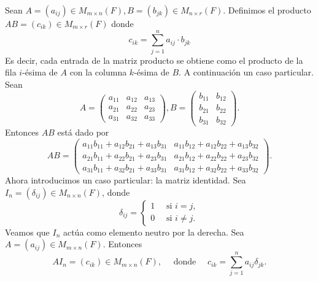 \documentclass[12pt,a4paper]{book}
\begin{document}
    Sean $A=(a_{ij})\in M_{m\times n}(F),B=(b_{jk})\in M_{n\times r}(F)$. Definimos el
    producto $AB=(c_{ik})\in M_{m\times r}(F)$ donde
    \begin{equation*}
        c_{ik}=\sum_{j=1}^{n}a_{ij}\cdot b_{jk}
    \end{equation*}
    Es decir, cada entrada de la matriz producto se obtiene como el producto de la fila $i$-ésima
    de $A$ con la columna $k$-ésima de $B$. A continuación un caso particular. Sean
    \begin{equation*}
        A=
        \begin{pmatrix}
            a_{11} & a_{12} & a_{13}\\
            a_{21} & a_{22} & a_{23}\\
            a_{31} & a_{32} & a_{33}
        \end{pmatrix},
        B=
        \begin{pmatrix}
            b_{11} & b_{12}\\
            b_{21} & b_{22}\\
            b_{31} & b_{32}
        \end{pmatrix}.
    \end{equation*}
    Entonces $AB$ está dado por
    \begin{equation*}
        AB=
        \begin{pmatrix}
            a_{11}b_{11}+a_{12}b_{21}+a_{13}b_{31} & a_{11}b_{12}+a_{12}b_{22}+a_{13}b_{32}\\
            a_{21}b_{11}+a_{22}b_{21}+a_{23}b_{31} & a_{21}b_{12}+a_{22}b_{22}+a_{23}b_{32}\\
            a_{31}b_{11}+a_{32}b_{21}+a_{33}b_{31} & a_{31}b_{12}+a_{32}b_{22}+a_{33}b_{32}
        \end{pmatrix}.
    \end{equation*}
    Ahora introducimos un caso particular: la matriz identidad. Sea $I_{n}=(\delta_{ij})\in M_{n\times n}(F)$, donde
    \begin{equation*}
        \delta_{ij}=
        \begin{cases}
            1\quad\text{ si }i=j,\\
            0\quad\text{ si }i\neq j.
        \end{cases}
    \end{equation*}
    Veamos que $I_{n}$ actúa como elemento neutro por la derecha. Sea $A=(a_{ij})\in M_{m\times n}(F)$.
    Entonces
    \begin{equation*}
        AI_{n}=(c_{ik})\in M_{m\times n}(F),\quad\text{ donde }\quad c_{ik}=\sum_{j=1}^{n}a_{ij}\delta_{jk}.
    \end{equation*}
\end{document}
